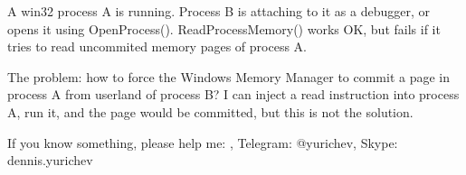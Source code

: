 \myhrule{}

A win32 process A is running.
Process B is attaching to it as a debugger, or opens it using OpenProcess().
ReadProcessMemory() works OK, but fails if it tries to read uncommited memory pages of process A.

The problem: how to force the Windows Memory Manager to commit a page in process A from userland of process B?
I can inject a read instruction into process A, run it, and the page would be committed, but this is not the solution.

\myhrule{}

If you know something, please help me: \EMAIL{}, Telegram: @yurichev, Skype: dennis.yurichev

